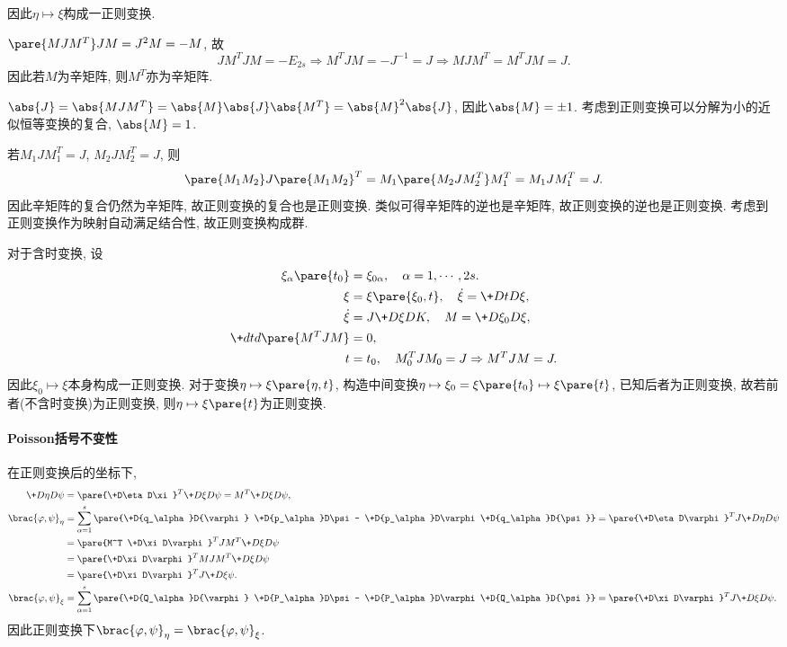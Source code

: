 \documentclass[../LectureNotes.tex]{subfiles}
\begin{document}
因此$\eta\mapsto \xi$构成一正则变换.
\begin{theorem}[辛矩阵的性质]
    \mbox{}
    \begin{cenum}
        \item $\pare{MJM^T}JM = J^2M = -M$, 故
        \[ JM^TJM = -E_{2s} \Rightarrow M^TJM = -J^{-1} = J \Rightarrow MJM^T = M^TJM = J. \]
        因此若$M$为辛矩阵, 则$M^T$亦为辛矩阵.
        \item $\abs{J} = \abs{MJM^T} = \abs{M}\abs{J}\abs{M^T} = \abs{M}^2\abs{J}$, 因此$\abs{M} = \pm 1$. 考虑到正则变换可以分解为小的近似恒等变换的复合, $\abs{M} = 1$.
        \item 若$M_1JM_1^T = J$, $M_2JM_2^T = J$, 则
        \[ \pare{M_1M_2}J\pare{M_1M_2}^T = M_1\pare{M_2JM_2^T}M_1^T = M_1JM_1^T = J. \]
        因此辛矩阵的复合仍然为辛矩阵, 故正则变换的复合也是正则变换. 类似可得辛矩阵的逆也是辛矩阵, 故正则变换的逆也是正则变换. 考虑到正则变换作为映射自动满足结合性, 故正则变换构成群.
    \end{cenum}
\end{theorem}
对于含时变换, 设
\begin{align*}
    \xi_\alpha\pare{t_0} &= \xi_{0\alpha},\quad \alpha = 1,\cdots, 2s. \\
    \xi &= \xi\pare{\xi_0,t},\quad \dot{\xi} = \+DtD\xi, \\
    \dot{\xi} &= J\+D\xi DK,\quad M = \+D{\xi_0}D\xi, \\
    \+dtd{}\pare{M^T JM} &= 0, \\
    t&= t_0,\quad M_0^TJM_0 = J \Rightarrow M^T JM = J.
\end{align*}
因此$\xi_0\mapsto \xi$本身构成一正则变换. 对于变换$\eta\mapsto \xi\pare{\eta,t}$, 构造中间变换$\eta\mapsto \xi_0 = \xi\pare{t_0} \mapsto \xi\pare{t}$, 已知后者为正则变换, 故若前者(不含时变换)为正则变换, 则$\eta\mapsto \xi\pare{t}$为正则变换.


\paragraph{Poisson括号不变性} %
\label{par:poisson括号不变性}

在正则变换后的坐标下,
\begin{align*}
    \+D\eta D\psi &= \pare{\+D\eta D\xi}^T \+D\xi D\psi = M^T \+D\xi D\psi, \\
    \brac{\varphi,\psi}_\eta &= \sum_{\alpha = 1}^s \pare{\+D{q_\alpha}D{\varphi} \+D{p_\alpha}D\psi - \+D{p_\alpha}D\varphi \+D{q_\alpha}D{\psi}} = \pare{\+D\eta D\varphi}^T J \+D\eta D\psi \\
    &= \pare{M^T \+D\xi D\varphi}^T JM^T\+D\xi D\psi \\
    &= \pare{\+D\xi D\varphi}^T MJM^T \+D\xi D\psi \\
    &= \pare{\+D\xi D\varphi}^T J \+D{\xi \psi}. \\
    \brac{\varphi,\psi}_\xi &= \sum_{\alpha = 1}^s \pare{\+D{Q_\alpha}D{\varphi} \+D{P_\alpha}D\psi - \+D{P_\alpha}D\varphi \+D{Q_\alpha}D{\psi}} = \pare{\+D\xi D\varphi}^T J \+D\xi D\psi.
\end{align*}
因此正则变换下$\brac{\varphi,\psi}_\eta = \brac{\varphi,\psi}_\xi$.
\end{document}
